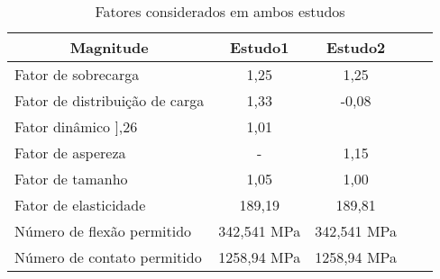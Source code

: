 \begin{table}[]
\centering
\caption{\label{tab:9} Fatores considerados em ambos estudos}
\begin{tabular}{l c c c c}
\hline
\multicolumn{1}{c}{\textbf{Magnitude}} & \textbf{Estudo1} & \textbf{Estudo2} \\ \hline
Fator de sobrecarga                 & 1,25              & 1,25 \\
Fator de distribuição de carga      & 1,33              & -0,08 \\
Fator dinâmico                      
],26              & 1,01              \\
Fator de aspereza                      & -                 & 1,15              \\
Fator de tamanho                       & 1,05              & 1,00              \\
Fator de elasticidade                  & 189,19            & 189,81            \\
Número de flexão permitido             & 342,541 MPa       & 342,541 MPa       \\
Número de contato permitido            & 1258,94 MPa       & 1258,94 MPa   \\ \hline  
\end{tabular}
\end{table}